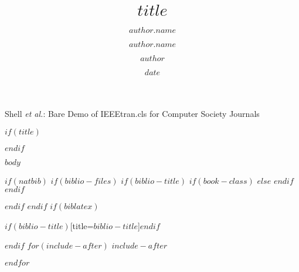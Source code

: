 \documentclass[10pt,journal,compsoc]{IEEEtran}
\title{$title$}
\date{$date$}
\author[$author.affiliation$,\Letter]{$author.name$}
\author[$author.affiliation$]{$author.name$}
\author{$author$}
\affil[$institutions.key$]{$institutions.name$}
\affil[ ]{\Letter \hspace{0.08cm}  Correspondence: \href{mailto:$author.correspondence$}{$author.correspondence$}}
\begin{document}
%
{Shell \MakeLowercase{\textit{et al.}}: Bare Demo of IEEEtran.cls for Computer Society Journals}


$if(title)$
\maketitle
$endif$

\IEEEdisplaynontitleabstractindextext
\IEEEpeerreviewmaketitle
{}


$body$


$if(natbib)$
$if(biblio-files)$
$if(biblio-title)$
$if(book-class)$
\renewcommand\bibname{$biblio-title$}
$else$
\renewcommand\refname{$biblio-title$}
$endif$
$endif$

{\footnotesize\sloppy}

$endif$
$endif$
$if(biblatex)$

{\footnotesize\sloppy\printbibliography$if(biblio-title)$[title=$biblio-title$]$endif$}

$endif$
$for(include-after)$
$include-after$

$endfor$
\end{document}
